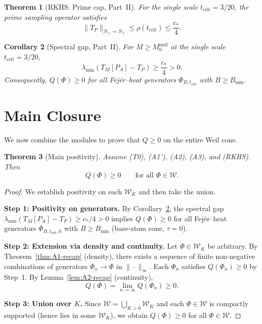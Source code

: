 \documentclass[11pt,a4paper]{article}
\newtheorem{theorem}{Theorem}[section]
\newtheorem{corollary}[theorem]{Corollary}
\theoremstyle{definition}
\theoremstyle{remark}
\begin{document}
\begin{theorem}[RKHS: Prime cap, Part~II]\label{thm:RKHS-recap}
For the single scale $t_{\mathrm{crit}} = 3/20$, the prime sampling operator satisfies
\begin{equation}\label{eq:prime-cap}
  \|T_P\|_{\mathcal{H}_t \to \mathcal{H}_t} \leq \rho(t_{\mathrm{crit}}) \le \frac{c_*}{4}.
\end{equation}
\end{theorem}

\begin{corollary}[Spectral gap, Part~II]\label{cor:gap}
For $M \geq M_0^{\mathrm{unif}}$ at the single scale $t_{\mathrm{crit}} = 3/20$,
\begin{equation}\label{eq:gap-bound}
  \lambda_{\min}(T_M[P_A] - T_P) \geq \frac{c_*}{4} > 0.
\end{equation}
Consequently, $Q(\Phi) \geq 0$ for all Fej\'er--heat generators $\Phi_{B,t_{\mathrm{crit}}}$ with $B \geq B_{\min}$.
\end{corollary}

\section{Main Closure}
\label{sec:main}

We now combine the modules to prove that $Q \geq 0$ on the entire Weil cone.

\begin{theorem}[Main positivity]\label{thm:main-pos}
Assume \textup{(T0)}, \textup{(A1')}, \textup{(A2)}, \textup{(A3)}, and \textup{(RKHS)}. Then
\begin{equation}\label{eq:main-pos}
  Q(\Phi) \geq 0 \qquad \text{for all } \Phi \in \mathcal{W}.
\end{equation}
\end{theorem}

\begin{proof}
We establish positivity on each $\mathcal{W}_K$ and then take the union.

\textbf{Step 1: Positivity on generators.}
By Corollary~\ref{cor:gap}, the spectral gap $\lambda_{\min}(T_M[P_A] - T_P) \geq c_*/4 > 0$ implies $Q(\Phi) \geq 0$ for all Fej\'er--heat generators $\Phi_{B,t_{\mathrm{crit}},0}$ with $B \geq B_{\min}$ (base-atom cone, $\tau=0$).

\textbf{Step 2: Extension via density and continuity.}
Let $\Phi \in \mathcal{W}_K$ be arbitrary. By Theorem~\ref{thm:A1-recap} (density), there exists a sequence of finite non-negative combinations of generators $\Phi_n \to \Phi$ in $\|\cdot\|_\infty$. Each $\Phi_n$ satisfies $Q(\Phi_n) \geq 0$ by Step~1. By Lemma~\ref{lem:A2-recap} (continuity),
\[
  Q(\Phi) = \lim_{n \to \infty} Q(\Phi_n) \geq 0.
\]

\textbf{Step 3: Union over $K$.}
Since $\mathcal{W} = \bigcup_{K > 0} \mathcal{W}_K$ and each $\Phi \in \mathcal{W}$ is compactly supported (hence lies in some $\mathcal{W}_K$), we obtain $Q(\Phi) \geq 0$ for all $\Phi \in \mathcal{W}$.
\end{proof}
\end{document}
